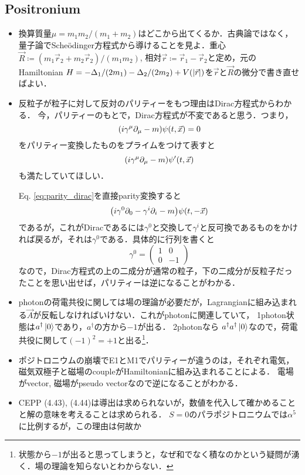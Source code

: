 \subsection{Positronium}
\begin{itemize}
		\item 換算質量$\mu = m_1m_2/(m_1 + m_2) $はどこから出てくるか．古典論ではなく，量子論でSche\"{o}dinger方程式から導けることを見よ．重心$\vec{R}\coloneqq (m_1\vec{r}_2+m_2\vec{r}_2)/(m_1m_2) $, 相対$\vec{r}\coloneqq \vec{r}_1-\vec{r}_2$と定め，元のHamiltonian $H = -\Delta_1/(2m_1)-\Delta_2/(2m_2)+V(\abs{\vec{r}}) $を$\vec{r} $と$\vec{R} $の微分で書き直せばよい．
		\item 反粒子が粒子に対して反対のパリティーをもつ理由はDirac方程式からわかる．
				今，パリティーのもとで，Dirac方程式が不変であると思う．つまり，
				\begin{equation}
						\qty(i\gamma^{\mu}\partial_{\mu} - m)\psi(t, \vec{x}) = 0\label{eq:parity_dirac}
				\end{equation}
				をパリティー変換したものをプライムをつけて表すと
				\begin{equation}
						\qty(i\gamma^{\mu}\partial_{\mu}-m)\psi'(t, \vec{x})
				\end{equation}
				も満たしていてほしい．

				Eq. \eqref{eq:parity_dirac}を直接parity変換すると
				\begin{equation}
						\qty(i\gamma^{0}\partial_0 - \gamma^{i}\partial_{i}-m)\psi(t, -\vec{x})
				\end{equation}
				であるが，これがDiracであるには$\gamma^0 $と交換して$\gamma^i $と反可換であるものをかければ戻るが，それは$\gamma^0 $である．具体的に行列を書くと
				\begin{equation}
						\gamma^{0} = \begin{pmatrix}
								1 & 0\\
								0 & -1
						\end{pmatrix}
				\end{equation}
				なので，Dirac方程式の上の二成分が通常の粒子，下の二成分が反粒子だったことを思い出せば，パリティーは逆になることがわかる．
		\item photonの荷電共役に関しては場の理論が必要だが，Lagrangianに組み込まれる$\vec{A} $が反転しなければいけない．これがphotonに関連していて，
				1photon状態は$a^{\dagger}\ket{0} $であり，$a^{\dagger} $の方から$-1 $が出る．
				2photonなら
				$a^{\dagger}a^{\dagger}\ket{0} $なので，荷電共役に関して$(-1)^2=+1 $と出る\footnote{状態から$-1 $が出ると思ってしまうと，なぜ和でなく積なのかという疑問が湧く．場の理論を知らないとわからない．}．
		\item ポジトロニウムの崩壊でE1とM1でパリティーが違うのは，それぞれ電気，磁気双極子と磁場のcoupleがHamiltonianに組み込まれることによる．
				電場がvector, 磁場がpseudo vectorなので逆になることがわかる．
				
		\item CEPP (4.43), (4.44)は導出は求められないが，数値を代入して確かめることと解の意味を考えることは求められる．
				$S=0 $のパラポジトロニウムでは$\alpha^5 $に比例するが，この理由は何故か
\end{itemize}
